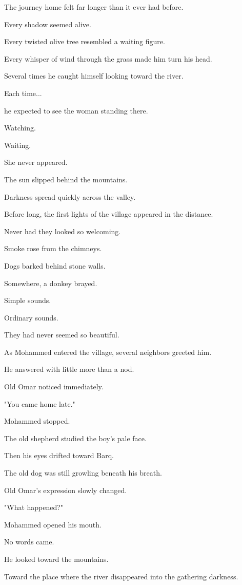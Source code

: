 \documentclass[12pt,openany]{book}
\begin{document}
The journey home felt far longer than it ever had before.

Every shadow seemed alive.

Every twisted olive tree resembled a waiting figure.

Every whisper of wind through the grass made him turn his head.

Several times he caught himself looking toward the river.

Each time...

he expected to see the woman standing there.

Watching.

Waiting.

She never appeared.

The sun slipped behind the mountains.

Darkness spread quickly across the valley.

Before long, the first lights of the village appeared in the distance.

Never had they looked so welcoming.

Smoke rose from the chimneys.

Dogs barked behind stone walls.

Somewhere, a donkey brayed.

Simple sounds.

Ordinary sounds.

They had never seemed so beautiful.

As Mohammed entered the village, several neighbors greeted him.

He answered with little more than a nod.

Old Omar noticed immediately.

"You came home late."

Mohammed stopped.

The old shepherd studied the boy's pale face.

Then his eyes drifted toward Barq.

The old dog was still growling beneath his breath.

Old Omar's expression slowly changed.

"What happened?"

Mohammed opened his mouth.

No words came.

He looked toward the mountains.

Toward the place where the river disappeared into the gathering darkness.
\end{document}
